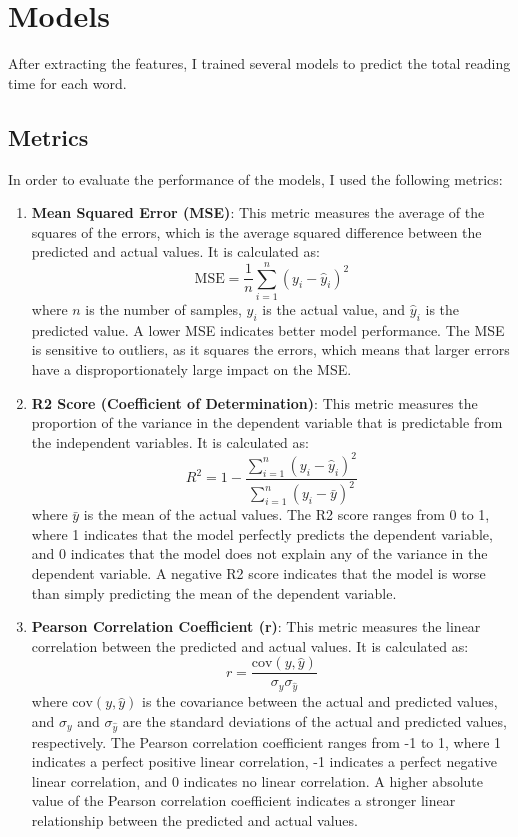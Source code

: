 \chapter{Models}
After extracting the features, I trained several models to predict the total reading time for each word.

\section{Metrics}
In order to evaluate the performance of the models, I used the following metrics:
\begin{enumerate}
    \item \textbf{Mean Squared Error (MSE)}: This metric measures the average of the squares of the errors, which is the average squared difference between the predicted and actual values. It is calculated as:
    \begin{equation}
        \text{MSE} = \frac{1}{n} \sum_{i=1}^{n} (y_i - \hat{y}_i)^2
    \end{equation}
    where \( n \) is the number of samples, \( y_i \) is the actual value, and \( \hat{y}_i \) is the predicted value. A lower MSE indicates better model performance. The MSE is sensitive to outliers, as it squares the errors, which means that larger errors have a disproportionately large impact on the MSE.

    \item \textbf{R2 Score (Coefficient of Determination)}: This metric measures the proportion of the variance in the dependent variable that is predictable from the independent variables. It is calculated as:
    \begin{equation}
        R^2 = 1 - \frac{\sum_{i=1}^{n} (y_i - \hat{y}_i)^2}{\sum_{i=1}^{n} (y_i - \bar{y})^2}
    \end{equation}
    where \( \bar{y} \) is the mean of the actual values. The R2 score ranges from 0 to 1, where 1 indicates that the model perfectly predicts the dependent variable, and 0 indicates that the model does not explain any of the variance in the dependent variable. A negative R2 score indicates that the model is worse than simply predicting the mean of the dependent variable.

    \item \textbf{Pearson Correlation Coefficient (r)}: This metric measures the linear correlation between the predicted and actual values. It is calculated as:
    \begin{equation}
        r = \frac{\text{cov}(y, \hat{y})}{\sigma_y \sigma_{\hat{y}}}
    \end{equation}
    where \( \text{cov}(y, \hat{y}) \) is the covariance between the actual and predicted values, and \( \sigma_y \) and \( \sigma_{\hat{y}} \) are the standard deviations of the actual and predicted values, respectively. The Pearson correlation coefficient ranges from -1 to 1, where 1 indicates a perfect positive linear correlation, -1 indicates a perfect negative linear correlation, and 0 indicates no linear correlation. A higher absolute value of the Pearson correlation coefficient indicates a stronger linear relationship between the predicted and actual values.


\end{enumerate}
